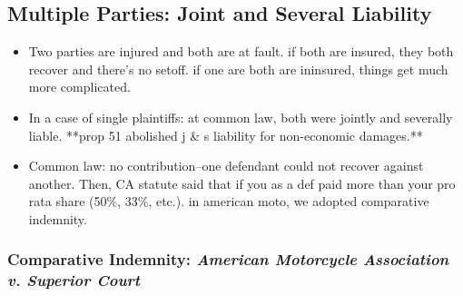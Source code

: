 \subsection{Multiple Parties: Joint and Several Liability}

\begin{itemize}
    \item Two parties are injured and both are at fault. if both are insured, they both recover and there's no setoff. if one are both are ininsured, things get much more complicated.
    \item In a case of single plaintiffs: at common law, both were jointly and 
    severally liable. **prop 51 abolished j \& s liability for non-economic damages.**
    \item Common law: no contribution--one defendant could not recover against another. Then, CA statute said that if you as a def paid more than your pro rata share (50\%, 33\%, etc.). in american moto, we adopted comparative indemnity.
\end{itemize}

\subsubsection{Comparative Indemnity: \emph{American Motorcycle Association v. Superior Court}}

